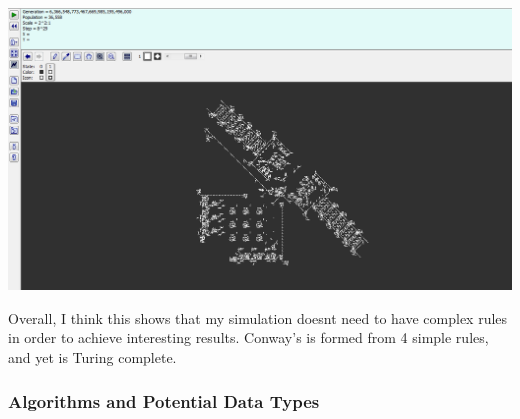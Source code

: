 \begin{flushleft}
                        \vspace{0.5cm}
                        \centerline{\includegraphics[width=14cm]{Images/InitialResearch/ConwaysTuringMachine.png}}
                        \vspace{0.2cm}

                        Overall, I think this shows that my simulation doesnt need to have complex rules in order to achieve 
                        interesting results. Conway's is formed from 4 simple rules, and yet is Turing complete.

                    \vspace{1cm}
                \subsubsection{Algorithms and Potential Data Types}
                    \large
                    \vspace{0.2cm}

\end{flushleft}
